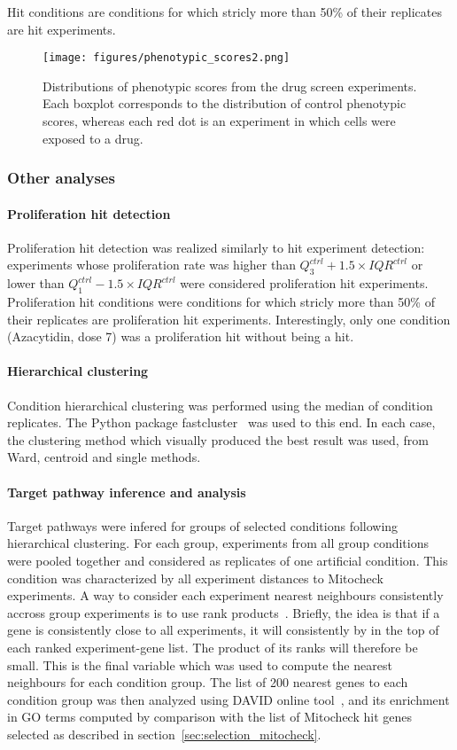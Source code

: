 Hit conditions are conditions for which stricly more than 50\% of their replicates are hit experiments.

\begin{figure*}[ht!]
\centerline{\texttt{[image: figures/phenotypic\_scores2.png]}
}
\caption{Distributions of phenotypic scores from the drug screen experiments. Each boxplot corresponds to the distribution of control phenotypic scores, whereas each red dot is an experiment in which cells were exposed to a drug.}
\label{hit_ds}
\end{figure*}

\subsubsection{Other analyses}
\label{sec:other_analyses}
\paragraph{Proliferation hit detection}
Proliferation hit detection was realized similarly to hit experiment detection: experiments whose proliferation rate was higher than $Q_3^{ctrl} + 1.5\times IQR^{ctrl}$ or lower than $Q_1^{ctrl} - 1.5\times IQR^{ctrl}$ were considered proliferation hit experiments. Proliferation hit conditions were conditions for which stricly more than 50\% of their replicates are proliferation hit experiments. Interestingly, only one condition (Azacytidin, dose 7) was a proliferation hit without being a hit.
\paragraph{Hierarchical clustering}
Condition hierarchical clustering was performed using the median of condition replicates. The Python package fastcluster~\cite{fastcluster} was used to this end. In each case, the clustering method which visually produced the best result was used, from Ward, centroid and single methods.

\paragraph{Target pathway inference and analysis}
Target pathways were infered for groups of selected conditions following hierarchical clustering. For each group, experiments from all group conditions were pooled together and considered as replicates of one artificial condition. This condition was characterized by all experiment distances to Mitocheck experiments. A way to consider each experiment nearest neighbours consistently accross group experiments is to use rank products~\cite{pmid15327980}. Briefly, the idea is that if a gene is consistently close to all experiments, it will consistently by in the top of each ranked experiment-gene list. The product of its ranks will therefore be small. This is the final variable which was used to compute the nearest neighbours for each condition group. The list of 200 nearest genes to each condition group was then analyzed using DAVID online tool~\cite{pmid22543366}, and its enrichment in GO terms computed by comparison with the list of Mitocheck hit genes selected as described in section~\ref{sec:selection_mitocheck}.

